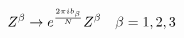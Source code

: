 \begin{equation}
Z^\beta \rightarrow e^{2 \pi i b_\beta \over N} Z^\beta \, \,\,\,\,\, 
\beta=1,2,3
\end{equation}

